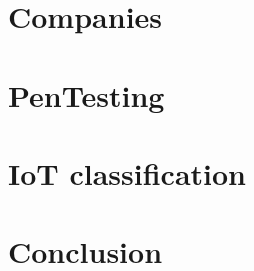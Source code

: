 \documentclass[a4paper,english,11pt]{article}
\begin{document}
	\newpage
	
	\section{Companies}
	\label{sec:empresas}
	
	
	\newpage
	
	\section{PenTesting}
	\label{sec:pentesting}
	
		
	\section{IoT classification}
	\label{sec:iot}
	
	
	\section{Conclusion}
	\label{sec:artcomp}
	
	
	\newpage
	
\end{document}
